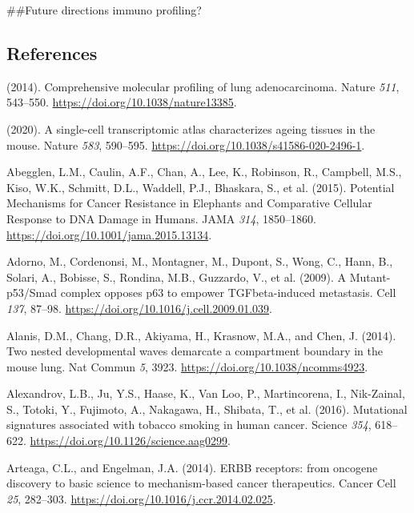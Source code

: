 \#\#Future directions
immuno profiling?

\hypertarget{references}{%
\subsection{References}\label{references}}

\hypertarget{refs}{}
\begin{CSLReferences}{0}{0}
\leavevmode{}%
(2014). Comprehensive molecular profiling of lung adenocarcinoma. Nature \emph{511}, 543--550. \url{https://doi.org/10.1038/nature13385}.

\leavevmode{}%
(2020). A single-cell transcriptomic atlas characterizes ageing tissues in the mouse. Nature \emph{583}, 590--595. \url{https://doi.org/10.1038/s41586-020-2496-1}.

\leavevmode{}%
Abegglen, L.M., Caulin, A.F., Chan, A., Lee, K., Robinson, R., Campbell, M.S., Kiso, W.K., Schmitt, D.L., Waddell, P.J., Bhaskara, S., et al. (2015). Potential Mechanisms for Cancer Resistance in Elephants and Comparative Cellular Response to DNA Damage in Humans. JAMA \emph{314}, 1850--1860. \url{https://doi.org/10.1001/jama.2015.13134}.

\leavevmode{}%
Adorno, M., Cordenonsi, M., Montagner, M., Dupont, S., Wong, C., Hann, B., Solari, A., Bobisse, S., Rondina, M.B., Guzzardo, V., et al. (2009). A Mutant-p53/Smad complex opposes p63 to empower TGFbeta-induced metastasis. Cell \emph{137}, 87--98. \url{https://doi.org/10.1016/j.cell.2009.01.039}.

\leavevmode{}%
Alanis, D.M., Chang, D.R., Akiyama, H., Krasnow, M.A., and Chen, J. (2014). Two nested developmental waves demarcate a compartment boundary in the mouse lung. Nat Commun \emph{5}, 3923. \url{https://doi.org/10.1038/ncomms4923}.

\leavevmode{}%
Alexandrov, L.B., Ju, Y.S., Haase, K., Van Loo, P., Martincorena, I., Nik-Zainal, S., Totoki, Y., Fujimoto, A., Nakagawa, H., Shibata, T., et al. (2016). Mutational signatures associated with tobacco smoking in human cancer. Science \emph{354}, 618--622. \url{https://doi.org/10.1126/science.aag0299}.

\leavevmode{}%
Arteaga, C.L., and Engelman, J.A. (2014). ERBB receptors: from oncogene discovery to basic science to mechanism-based cancer therapeutics. Cancer Cell \emph{25}, 282--303. \url{https://doi.org/10.1016/j.ccr.2014.02.025}.


\end{CSLReferences}
